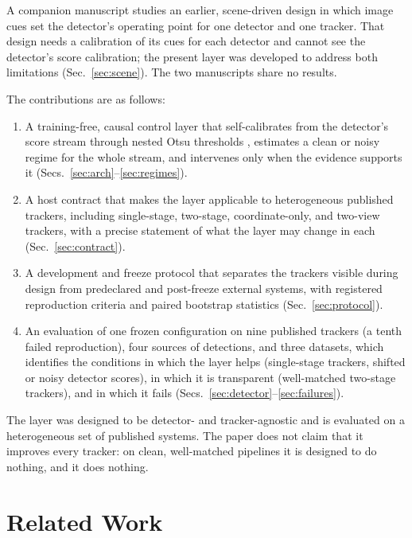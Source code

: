 \documentclass[journal]{new-aiaa}
\begin{document}
A companion manuscript studies an earlier, scene-driven design in which image cues set the detector's operating point for one detector and one tracker. That design needs a calibration of its cues for each detector and cannot see the detector's score calibration; the present layer was developed to address both limitations (Sec.~\ref{sec:scene}). The two manuscripts share no results.

The contributions are as follows:
\begin{enumerate}
\item A training-free, causal control layer that self-calibrates from the detector's score stream through nested Otsu thresholds \cite{otsu1979}, estimates a clean or noisy regime for the whole stream, and intervenes only when the evidence supports it (Secs.~\ref{sec:arch}--\ref{sec:regimes}).
\item A host contract that makes the layer applicable to heterogeneous published trackers, including single-stage, two-stage, coordinate-only, and two-view trackers, with a precise statement of what the layer may change in each (Sec.~\ref{sec:contract}).
\item A development and freeze protocol that separates the trackers visible during design from predeclared and post-freeze external systems, with registered reproduction criteria and paired bootstrap statistics (Sec.~\ref{sec:protocol}).
\item An evaluation of one frozen configuration on nine published trackers (a tenth failed reproduction), four sources of detections, and three datasets, which identifies the conditions in which the layer helps (single-stage trackers, shifted or noisy detector scores), in which it is transparent (well-matched two-stage trackers), and in which it fails (Secs.~\ref{sec:detector}--\ref{sec:failures}).
\end{enumerate}

The layer was designed to be detector- and tracker-agnostic and is evaluated on a heterogeneous set of published systems. The paper does not claim that it improves every tracker: on clean, well-matched pipelines it is designed to do nothing, and it does nothing.

\section{Related Work}\label{sec:related}
\end{document}

